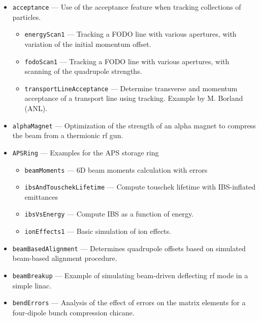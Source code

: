 \begin{itemize}
\item \verb|acceptance| --- 
 Use of the acceptance feature when tracking collections of particles. 

\begin{itemize}
\item \verb|energyScan1| --- 
 Tracking a FODO line with various apertures, with variation of the initial momentum offset. 

\item \verb|fodoScan1| --- 
 Tracking a FODO line with various apertures, with scanning of the quadrupole strengths. 

\item \verb|transportLineAcceptance| --- 
Determine transverse and momentum acceptance of a transport line using tracking.
Example by M. Borland (ANL).

\end{itemize}
\item \verb|alphaMagnet| --- 
 Optimization of the strength of an alpha magnet to compress the beam from a thermionic rf gun. 

\item \verb|APSRing| --- 
Examples for the APS storage ring

\begin{itemize}
\item \verb|beamMoments| --- 
6D beam moments calculation with errors

\item \verb|ibsAndTouschekLifetime| --- 
Compute touschek lifetime with IBS-inflated emittances

\item \verb|ibsVsEnergy| --- 
Compute IBS as a function of energy.

\item \verb|ionEffects1| --- 
Basic simulation of ion effects.

\end{itemize}
\item \verb|beamBasedAlignment| --- 
 Determines quadrupole offsets based on simulated beam-based alignment procedure. 

\item \verb|beamBreakup| --- 
 Example of simulating beam-driven deflecting rf mode in a simple linac. 

\item \verb|bendErrors| --- 
 Analysis of the effect of errors on the matrix elements for a four-dipole bunch compression chicane. 


\end{itemize}
